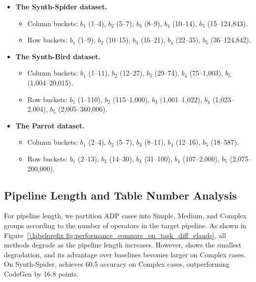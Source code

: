 \begin{itemize}[leftmargin=*]
    \item \textbf{The Synth-Spider dataset.}
    \begin{itemize}
        \item Column buckets: $b_1$ (1--4), $b_2$ (5--7), $b_3$ (8--9), $b_4$ (10--14), $b_5$ (15--124,843).
        \item Row buckets: $b_1$ (1--9), $b_2$ (10--15), $b_3$ (16--21), $b_4$ (22--35), $b_5$ (36--124,842).
    \end{itemize}
    \item \textbf{The Synth-Bird dataset.}
    \begin{itemize}
        \item Column buckets: $b_1$ (1--11), $b_2$ (12--27), $b_3$ (29--74), $b_4$ (75--1,003), $b_5$ (1,004--20,015).
        \item Row buckets: $b_1$ (1--110), $b_2$ (115--1,000), $b_3$ (1,001--1,022), $b_4$ (1,023--2,004), $b_5$ (2,005--360,006).
    \end{itemize}
    \item \textbf{The Parrot dataset.}
    \begin{itemize}
        \item Column buckets: $b_1$ (2--4), $b_2$ (5--7), $b_3$ (8--11), $b_4$ (12--16), $b_5$ (18--587).
        \item Row buckets: $b_1$ (2--13), $b_2$ (14--30), $b_3$ (31--100), $b_4$ (107--2,000), $b_5$ (2,075--200,000).
    \end{itemize}
\end{itemize}

\subsection{Pipeline Length and Table Number Analysis}
\label{subsec:appendix_pipeline_table}




For pipeline length, we partition ADP cases into Simple, Medium, and Complex groups according to the number of operators in the target pipeline. As shown in Figure~\ref{\labelprefix fig:performance_compare_on_task_diff_claude}, all methods degrade as the pipeline length increases. However, \sys shows the smallest degradation, and its advantage over baselines becomes larger on Complex cases. On Synth-Spider, \sys achieves 60.5 accuracy on Complex cases, outperforming CodeGen by 16.8 points.

